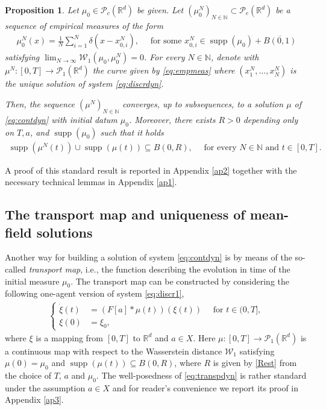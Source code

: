 \documentclass[A4paper,11pt]{article}
\newtheorem{proposition}[theorem]{Proposition}
\theoremstyle{definition}
\newcommand{\N}{\mathbb{N}}
\newcommand{\R}{\mathbb{R}}
\newcommand{\W}{\mathcal{W}}
\newcommand{\PP}{\mathcal{P}_1}
\newcommand{\PC}{\mathcal{P}_c}
\DeclareMathOperator{\supp}{supp}
\begin{document}
\begin{proposition}\label{pr:exist}
Let $\mu_0 \in \PC(\R^d)$ be given. Let $(\mu^{N}_0)_{N \in \N} \subset \PC(\R^d)$ be a sequence of empirical measures of the form
\begin{align*}
\mu^{N}_0(x) = \frac{1}{N}\sum^N_{i = 1} \delta(x - x^{N}_{0,i}), \quad \text{ for some } x^{N}_{0,i} \in \supp(\mu_0) + \overline{B(0,1)}
\end{align*}
satisfying $\lim_{N \rightarrow \infty} \W_1(\mu_0,\mu^{N}_0) = 0$. For every $N \in \N$, denote with $\mu^N:[0,T] \rightarrow \PP(\R^{d})$ the curve given by \eqref{eq:empmeas} where $(x^N_1,\ldots,x^N_N)$ is the unique solution of system \eqref{eq:discrdyn}.

Then, the sequence $(\mu^N)_{N \in \N}$ converges, up to subsequences, to a solution $\mu$ of \eqref{eq:contdyn} with initial datum $\mu_0$. Moreover, there exists $R > 0$ depending only on $T,a$, and $\supp(\mu_0)$ such that it holds
\begin{align*}
\supp(\mu^N(t)) \cup \supp(\mu(t)) \subseteq B(0,R), \quad \text{ for every } N \in \N \text{ and } t \in [0,T].
\end{align*}
\end{proposition}

 A proof of this standard result is reported in Appendix \ref{ap2} together with the necessary technical lemmas in Appendix \ref{ap1}.

\subsection{The transport map and  uniqueness of mean-field solutions}

Another way for building a solution of system \eqref{eq:contdyn} is by means of the so-called \textit{transport map}, i.e., the function describing the evolution in time of the initial measure $\mu_0$. The transport map can be constructed by considering the following one-agent version of system \eqref{eq:discr1},
\begin{align}\label{eq:transpdyn}
\left\{\begin{aligned}
\dot{\xi}(t) &= (F[a]*\mu(t))(\xi(t)) \quad \text{ for } t \in (0,T],\\
\xi(0) &= \xi_0,
\end{aligned}\right.
\end{align}
where $\xi$ is a mapping from $[0,T]$ to $\R^d$ and $a \in X$. Here $\mu:[0,T]\rightarrow\PP(\R^d)$ is a continuous map with respect to the Wasserstein distance $\W_1$ satisfying $\mu(0) = \mu_0$ and $\supp(\mu(t)) \subseteq B(0,R)$, where $R$ is given by \eqref{Rest} from the choice of $T$, $a$ and $\mu_0$. The well-posedness of \eqref{eq:transpdyn} is rather standard under the assumption $a \in X$ and for reader's convenience we report its proof in Appendix \ref{ap3}.
\end{document}

